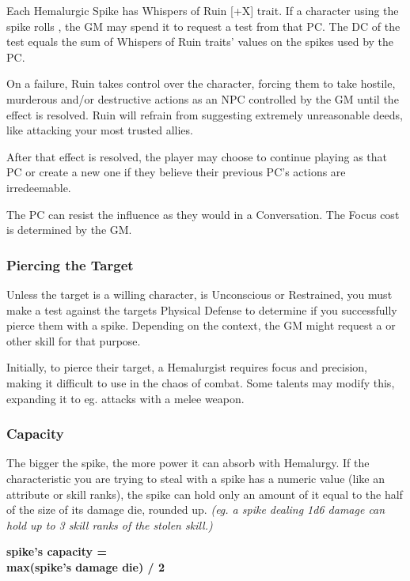 Each Hemalurgic Spike has Whispers of Ruin [+X] trait. If a character using the spike rolls \iconComp{}, the GM may spend it to request a \skillDiscipline{} test from that PC. The DC of the test equals the sum of Whispers of Ruin traits' values on the spikes used by the PC.

On a failure, Ruin takes control over the character, forcing them to take hostile, murderous and/or destructive actions as an NPC controlled by the GM until the effect is resolved. Ruin will refrain from suggesting extremely unreasonable deeds, like attacking your most trusted allies.

After that effect is resolved, the player may choose to continue playing as that PC or create a new one if they believe their previous PC's actions are irredeemable.

The PC can resist the influence as they would in a Conversation. The Focus cost is determined by the GM.



\subsubsection{Piercing the Target}

Unless the target is a willing character, is Unconscious or Restrained, you must make a test against the targets Physical Defense to determine if you successfully pierce them with a spike. Depending on the context, the GM might request a \skillThievery{} or other skill for that purpose.

Initially, to pierce their target, a Hemalurgist requires focus and precision, making it difficult to use in the chaos of combat. Some talents may modify this, expanding it to eg. attacks with a melee weapon.


\newpage



\subsubsection{Capacity}

The bigger the spike, the more power it can absorb with Hemalurgy. If the characteristic you are trying to steal with a spike has a numeric value (like an attribute or skill ranks), the spike can hold only an amount of it equal to the half of the size of its damage die, rounded up. \textit{(eg. a spike dealing 1d6 damage can hold up to 3 skill ranks of the stolen skill.)}

\begin{center}
	\textbf{spike's capacity = \\max(spike's damage die) / 2}
\end{center}





